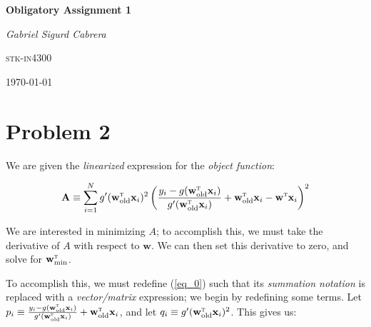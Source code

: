 \documentclass[a4paper,10pt,english]{article}
\begin{document}
\newcommand\esymbol[1]{\begin{circuitikz}
\draw (0,0) to [#1] (1,0); \end{circuitikz}}

\begin{titlepage}
	\centering
	{\scshape\LARGE \par}
	\vspace{1cm}
	{\huge\bfseries Obligatory Assignment 1 \par}
	\vspace{1.5cm}
	{\scshape\Large \par}
	\vspace{2cm}
	{\Large\itshape Gabriel Sigurd Cabrera\par}
	\vfill
	\textsc{stk-in}4300\vfill

	{\large \today\par}
\end{titlepage}

\section*{Problem 2}

We are given the \textit{linearized} expression for the \textit{object function}:

\begin{equation}
\label{eq_0}
\mathbf{A} \equiv \sum_{i=1}^{N} g^\prime(\mathbf{w}_\text{old}^\textsc{t} \mathbf{x}_i)^2 \left( \frac{y_i - g(\mathbf{w}_\text{old}^\textsc{t} \mathbf{x}_i)}{g^\prime(\mathbf{w}_\text{old}^\textsc{t} \mathbf{x}_i)} + \mathbf{w}_\text{old}^\textsc{t} \mathbf{x}_i - \mathbf{w}^\textsc{t} \mathbf{x}_i \right)^2
\end{equation}

We are interested in minimizing $A$; to accomplish this, we must take the derivative of $A$ with respect to $\mathbf{w}$. We can then set this derivative to zero, and solve for $\mathbf{w}_\text{min}^\textsc{t}$.

To accomplish this, we must redefine (\ref{eq_0}) such that its \textit{summation notation} is replaced with a \textit{vector/matrix} expression; we begin by redefining some terms.  Let $p_i \equiv \frac{y_i - g(\mathbf{w}_\text{old}^\textsc{t} \mathbf{x}_i)}{g^\prime(\mathbf{w}_\text{old}^\textsc{t} \mathbf{x}_i)} + \mathbf{w}_\text{old}^\textsc{t} \mathbf{x}_i$, and let $q_i \equiv g^\prime(\mathbf{w}_\text{old}^\textsc{t} \mathbf{x}_i)^2$.  This gives us:
\end{document}
